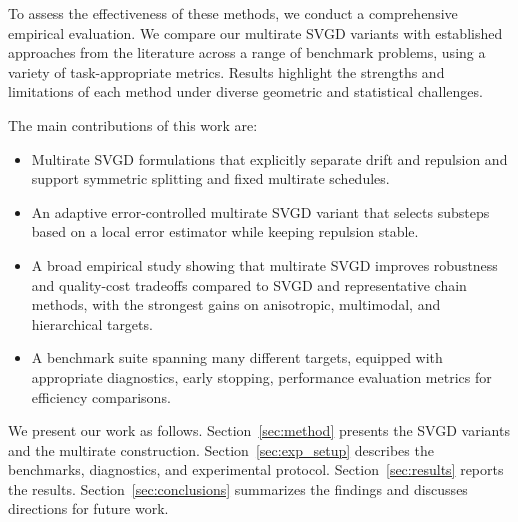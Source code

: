 To assess the effectiveness of these methods, we conduct a comprehensive empirical evaluation. We compare our multirate SVGD variants with established approaches from the literature across a range of benchmark problems, using a variety of task-appropriate metrics. Results highlight the strengths and limitations of each method under diverse geometric and statistical challenges.

The main contributions of this work are:
\begin{itemize}
  \item Multirate SVGD formulations that explicitly separate drift and repulsion
  and support symmetric splitting and fixed multirate schedules.
  \item An adaptive error-controlled multirate SVGD variant that selects 
  substeps based on a local error estimator while keeping repulsion stable.
  \item A broad empirical study showing that multirate SVGD improves robustness
  and quality-cost tradeoffs compared to SVGD and representative chain methods, with the strongest gains on
  anisotropic, multimodal, and hierarchical targets.
  \item A benchmark suite spanning many different targets,
  equipped with appropriate diagnostics, early stopping, performance evaluation metrics for efficiency comparisons.
\end{itemize}

We present our work as follows. Section~\ref{sec:method} presents the SVGD
variants and the multirate construction. Section~\ref{sec:exp_setup} describes
the benchmarks, diagnostics, and experimental protocol. Section~\ref{sec:results}
reports the results. Section~\ref{sec:conclusions} summarizes the findings and
discusses directions for future work.
